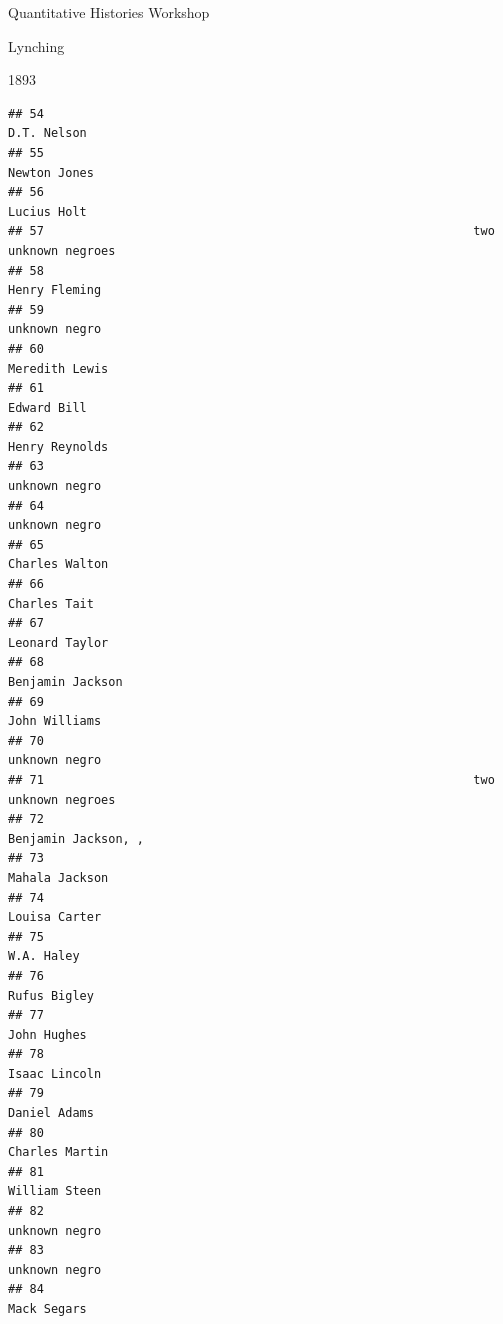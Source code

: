 \documentclass[
  ignorenonframetext,
]{beamer}
\begin{document}
\begin{frame}[fragile]{Quantitative Histories Workshop}
\begin{block}{Lynching}
\begin{block}{1893}
\begin{verbatim}
## 54                                                                    D.T. Nelson
## 55                                                                   Newton Jones
## 56                                                                    Lucius Holt
## 57                                                            two unknown negroes
## 58                                                                  Henry Fleming
## 59                                                                  unknown negro
## 60                                                                 Meredith Lewis
## 61                                                                    Edward Bill
## 62                                                                 Henry Reynolds
## 63                                                                  unknown negro
## 64                                                                  unknown negro
## 65                                                                 Charles Walton
## 66                                                                   Charles Tait
## 67                                                                 Leonard Taylor
## 68                                                               Benjamin Jackson
## 69                                                                  John Williams
## 70                                                                  unknown negro
## 71                                                            two unknown negroes
## 72                                                           Benjamin Jackson, , 
## 73                                                                 Mahala Jackson
## 74                                                                  Louisa Carter
## 75                                                                     W.A. Haley
## 76                                                                   Rufus Bigley
## 77                                                                    John Hughes
## 78                                                                  Isaac Lincoln
## 79                                                                   Daniel Adams
## 80                                                                 Charles Martin
## 81                                                                  William Steen
## 82                                                                  unknown negro
## 83                                                                  unknown negro
## 84                                                                    Mack Segars

\end{verbatim}
\end{block}
\end{block}
\end{frame}
\end{document}
